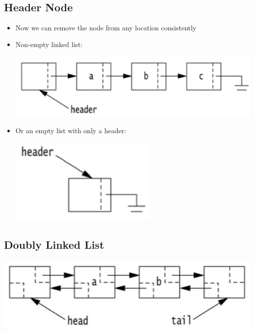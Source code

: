 \documentclass[10pt]{article}
\begin{document}
\subsection*{Header Node}
\begin{itemize}
    \item Now we can remove the node from any location consistently
    \item Non-empty linked list:
    
    \begin{center}
        \includegraphics[width=\textwidth/4]{images/6.png}
    \end{center}
    
    \item Or an empty list with only a header:
    
    \begin{center}
        \includegraphics[width=\textwidth/8]{images/7.png}
    \end{center}
\end{itemize}

\subsection*{Doubly Linked List}
\begin{center}
    \includegraphics[width=\textwidth/4]{images/8.png}
\end{center}
\end{document}
